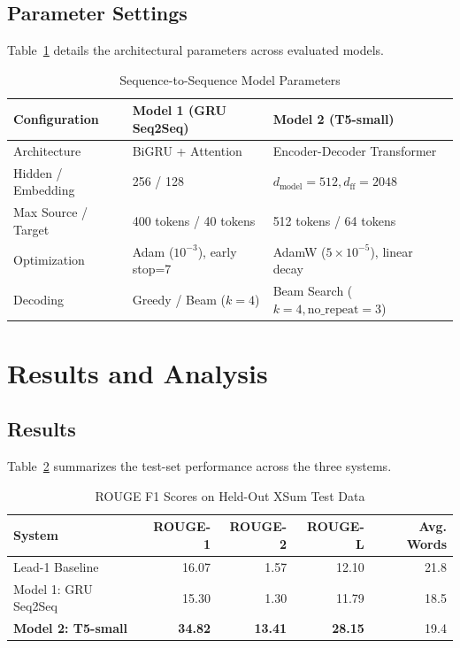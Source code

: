 \documentclass[conference]{IEEEtran}
\begin{document}
\subsection{Parameter Settings}
Table~\ref{tab:hyperparams} details the architectural parameters across evaluated models.

\begin{table}[htbp]
\caption{Sequence-to-Sequence Model Parameters}
\label{tab:hyperparams}
\centering
\small
\begin{tabular}{lll}
\toprule
\textbf{Configuration} & \textbf{Model 1 (GRU Seq2Seq)} & \textbf{Model 2 (T5-small)} \\
\midrule
Architecture & BiGRU + Attention & Encoder-Decoder Transformer \\
Hidden / Embedding & 256 / 128 & $d_{\text{model}}=512, d_{\text{ff}}=2048$ \\
Max Source / Target & 400 tokens / 40 tokens & 512 tokens / 64 tokens \\
Optimization & Adam ($10^{-3}$), early stop=7 & AdamW ($5\times 10^{-5}$), linear decay \\
Decoding & Greedy / Beam ($k=4$) & Beam Search ($k=4, \text{no\_repeat}=3$) \\
\bottomrule
\end{tabular}
\end{table}

\section{Results and Analysis}

\subsection{Results}
Table~\ref{tab:results} summarizes the test-set performance across the three systems.

\begin{table}[htbp]
\caption{ROUGE F1 Scores on Held-Out XSum Test Data}
\label{tab:results}
\centering
\small
\begin{tabular}{lrrrr}
\toprule
\textbf{System} & \textbf{ROUGE-1} & \textbf{ROUGE-2} & \textbf{ROUGE-L} & \textbf{Avg. Words} \\
\midrule
Lead-1 Baseline & 16.07 & 1.57 & 12.10 & 21.8 \\
Model 1: GRU Seq2Seq & 15.30 & 1.30 & 11.79 & 18.5 \\
\textbf{Model 2: T5-small} & \textbf{34.82} & \textbf{13.41} & \textbf{28.15} & 19.4 \\
\bottomrule
\end{tabular}
\end{table}
\end{document}
